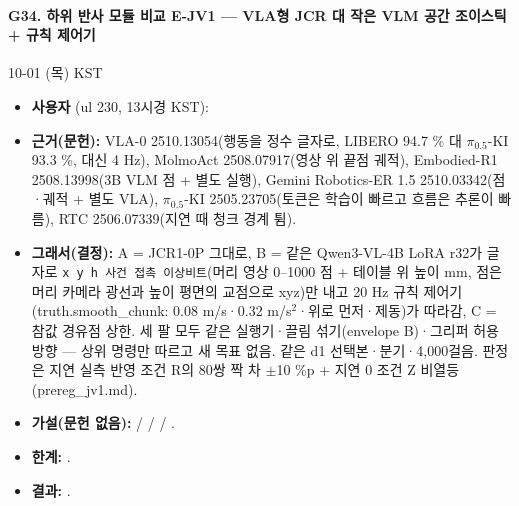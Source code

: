 \paragraph{G34. 하위 반사 모듈 비교 E-JV1 --- VLA형 JCR 대 작은 VLM 공간 조이스틱 + 규칙 제어기}
{\small 10-01 (목) KST}
\begin{itemize}
  \item \textbf{사용자} (ul 230, 13시경 KST): 
  \item \textbf{근거(문헌):} VLA-0 2510.13054(행동을 정수 글자로, LIBERO 94.7 \% 대 $\pi_{0.5}$-KI 93.3 \%, 대신 4 Hz), MolmoAct 2508.07917(영상 위 끝점 궤적), Embodied-R1 2508.13998(3B VLM 점 + 별도 실행), Gemini Robotics-ER 1.5 2510.03342(점·궤적 + 별도 VLA), $\pi_{0.5}$-KI 2505.23705(토큰은 학습이 빠르고 흐름은 추론이 빠름), RTC 2506.07339(지연 때 청크 경계 튐).
  \item \textbf{그래서(결정):} A = JCR1-0P 그대로, B = 같은 Qwen3-VL-4B LoRA r32가 글자로 \texttt{x y h 사건 접촉 이상비트}(머리 영상 0--1000 점 + 테이블 위 높이 mm, 점은 머리 카메라 광선과 높이 평면의 교점으로 xyz)만 내고 20 Hz 규칙 제어기(truth.smooth\_chunk: 0.08 m/s·0.32 m/s$^2$·위로 먼저·제동)가 따라감, C = 참값 경유점 상한. 세 팔 모두 같은 실행기·끌림 섞기(envelope B)·그리퍼 허용 방향 --- 상위 명령만 따르고 새 목표 없음. 같은 d1 선택본·분기·4,000걸음. 판정은 지연 실측 반영 조건 R의 80쌍 짝 차 $\pm$10 \%p + 지연 0 조건 Z 비열등(prereg\_jv1.md).
  \item \textbf{가설(문헌 없음):}  /  /  / .
  \item \textbf{한계:} .
  \item \textbf{결과:} .
\end{itemize}
